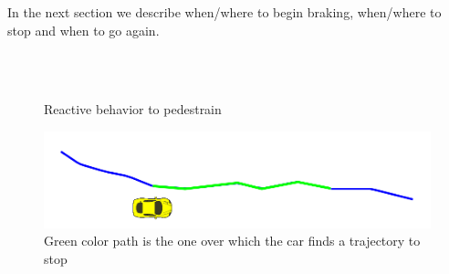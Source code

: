 \documentclass[letterpaper, 10 pt, conference]{ieeeconf}  %
\begin{document}
In the next section we describe when/where to begin braking, when/where to stop
and when to go again.

\begin{figure}[thpb]
\centering
  \\
  \\
  \caption{Reactive behavior to pedestrain}
  \label{fig:react}
\end{figure}

\begin{figure}[thpb]
  \centering
  \includegraphics[width=1.0\columnwidth]{graphics/RSTOP_path_truncation.png}
  \caption{Green color path is the one over which the car finds a trajectory to stop}
  \label{fig:pathtostop}
\end{figure}
\end{document}
